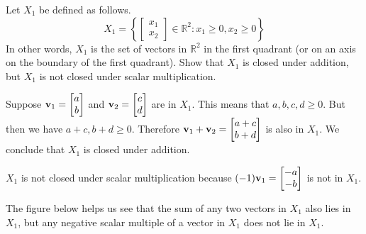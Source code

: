 \documentclass{ximera}
\renewcommand{\vec}[1]{{\bf #1}}
\begin{document}
\begin{example} \label{ex:Q1}
Let $X_1$ be defined as follows.
$$X_1=\left\{\begin{bmatrix} x_1\\x_2\end{bmatrix} \in \mathbb{R}^2 : x_1 \ge 0, x_2 \ge 0 \right\}$$
In other words, $X_1$ is the set of vectors in $\mathbb{R}^2$ in the first quadrant (or on an axis on the boundary of the first quadrant). Show that $X_1$ is closed under addition, but $X_1$ is not closed under scalar multiplication.


\begin{explanation} Suppose $\vec{v}_1=\begin{bmatrix}a\\b\end{bmatrix}$ and $\vec{v}_2=\begin{bmatrix}c\\d\end{bmatrix}$ are in $X_1$.  This means that $a, b, c, d\geq 0$.  But then we have $a+c, b+d\geq 0$.  Therefore $\vec{v}_1+\vec{v}_2=\begin{bmatrix}a+c\\b+d\end{bmatrix}$ is also in $X_1$. We conclude that $X_1$ is closed under addition.

$X_1$ is not closed under scalar multiplication because $(-1)\vec{v}_1=\begin{bmatrix}-a\\-b\end{bmatrix}$ is not in $X_1$.


The figure below helps us see that the sum of any two vectors in $X_1$ also lies in $X_1$, but any negative scalar multiple of a vector in $X_1$ does not lie in $X_1$.

\begin{center}
\end{center}
\end{explanation}
\end{example}
\end{document}
